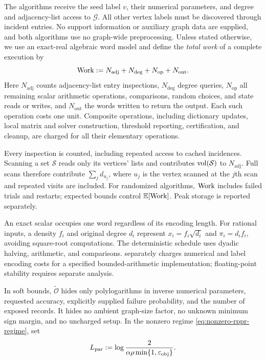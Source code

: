 The algorithms receive the seed label $v$, their numerical parameters, and
degree and adjacency-list access to $\mathcal G$. All other vertex labels
must be discovered through incident entries. No support information or
auxiliary graph data are supplied, and both algorithms use no graph-wide
preprocessing. Unless stated otherwise, we use an exact-real algebraic word model and
define the \emph{total work} of a complete execution by
\begin{equation}
 \operatorname{Work}:=N_{\mathrm{adj}}+N_{\mathrm{deg}}+N_{\mathrm{op}}+N_{\mathrm{out}}.
 \label{eq:total-work}
\end{equation}
Here $N_{\mathrm{adj}}$ counts adjacency-list entry inspections,
$N_{\mathrm{deg}}$ degree queries, $N_{\mathrm{op}}$ all remaining scalar
arithmetic operations, comparisons, random choices, and state reads or
writes, and $N_{\mathrm{out}}$ the words written to return the output. Each such operation
costs one unit. Composite operations, including dictionary updates,
local matrix and solver construction, threshold reporting, certification,
and cleanup, are charged for all their elementary operations.

Every inspection is counted, including repeated access to cached
incidences. Scanning a set $\mathcal S$ reads only its vertices' lists and
contributes $\operatorname{vol}(\mathcal S)$ to $N_{\mathrm{adj}}$. Full scans therefore
contribute $\sum_j d_{u_j}$, where $u_j$ is the vertex scanned at the
$j$th scan and repeated visits are included. For randomized algorithms,
$\operatorname{Work}$ includes failed trials and restarts; expected bounds control
$\mathbb{E}[\operatorname{Work}]$. Peak storage is reported separately.

An exact scalar occupies one word regardless of its encoding length.
For rational inputs, a density $f_i$ and original degree $d_i$ represent
$x_i=f_i\sqrt{d_i}$ and $\pi_i=d_if_i$, avoiding square-root computations.
The deterministic schedule uses dyadic halving, arithmetic, and comparisons.
 separately charges numerical and label
encoding costs for a specified bounded-arithmetic implementation;
floating-point stability requires separate analysis.

In soft bounds, $\widetilde{\mathcal{O}}$ hides only polylogarithms in inverse numerical
parameters, requested accuracy, explicitly supplied failure probability, and
the number of exposed records. It hides no ambient graph-size factor, no
unknown minimum sign margin, and no uncharged setup. In the nonzero regime
\cref{eq:nonzero-rppr-regime}, set
\begin{equation}
 L_{\mathrm{par}}:=\log\frac{2}{\alpha\rho\min\{1,\varepsilon_{\mathrm{obj}}\}}.
 \label{eq:main-parameter-log}
\end{equation}

